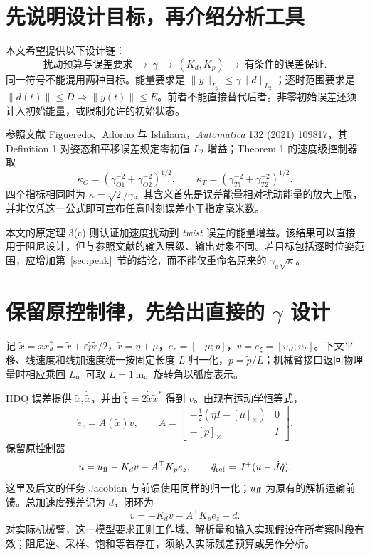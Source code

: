 \section{先说明设计目标，再介绍分析工具}

本文希望提供以下设计链：
\[
\boxed{\text{扰动预算与误差要求}\ \longrightarrow\ \gamma
\ \longrightarrow\ (K_d,K_p)\ \longrightarrow\ \text{有条件的误差保证}.}
\]
同一符号不能混用两种目标。能量要求是 $\|y\|_{L_2}\le\gamma\|d\|_{L_2}$；逐时范围要求是 $\|d(t)\|\le D\Rightarrow\|y(t)\|\le E$。前者不能直接替代后者。非零初始误差还须计入初始能量，或限制允许的初始状态。

参照文献 Figueredo、Adorno 与 Ishihara，\emph{Automatica} 132 (2021) 109817，其 Definition 1 对姿态和平移误差规定零初值 $L_2$ 增益；Theorem 1 的速度级控制器取
\[
\kappa_O=(\gamma_{O1}^{-2}+\gamma_{O2}^{-2})^{1/2},\qquad
\kappa_T=(\gamma_{T1}^{-2}+\gamma_{T2}^{-2})^{1/2}.
\]
四个指标相同时为 $\kappa=\sqrt2/\gamma$。其含义首先是误差能量相对扰动能量的放大上限，并非仅凭这一公式即可宣布任意时刻误差小于指定毫米数。

本文的原定理 3(c) 则认证加速度扰动到 \emph{twist} 误差的能量增益。该结果可以直接用于阻尼设计，但与参照文献的输入层级、输出对象不同。若目标包括逐时位姿范围，应增加第~\ref{sec:peak}~节的结论，而不能仅重命名原来的 $\gamma_a\sqrt\kappa$。

\section{保留原控制律，先给出直接的 \texorpdfstring{$\gamma$}{gamma} 设计}

记 $\widetilde x=xx_d^*=\widetilde r+\varepsilon\widetilde p\widetilde r/2$，$\widetilde r=\eta+\mu$，$e_z=[-\mu;p]$，$v=e_\xi=[v_R;v_T]$。下文平移、线速度和线加速度统一按固定长度 $L$ 归一化，$p=\widetilde p/L$；机械臂接口返回物理量时相应乘回 $L$。可取 $L=1\,\mathrm m$。旋转角以弧度表示。

HDQ 误差提供 $\widetilde x,\dot{\widetilde x}$，并由 $\widetilde\xi=2\dot{\widetilde x}\widetilde x^*$ 得到 $v$。由现有运动学恒等式，
\begin{equation}
\dot e_z=A(\widetilde x)v,
\qquad
A=\begin{bmatrix}
-\frac12(\eta I-[\mu]_\times)&0\\
-[p]_\times&I
\end{bmatrix}.
\label{new:kin}
\end{equation}
保留原控制器
\begin{equation}
u=u_{\rm ff}-K_dv-A^\top K_pe_z,
\qquad
\ddot q_{\rm ref}=J^+(u-\dot J\dot q).
\label{new:controller}
\end{equation}
这里及后文的任务 Jacobian 与前馈使用同样的归一化；$u_{\rm ff}$ 为原有的解析运输前馈。总加速度残差记为 $d$，闭环为
\begin{equation}
\dot v=-K_dv-A^\top K_pe_z+d.
\label{new:closed}
\end{equation}
对实际机械臂，这一模型要求正则工作域、解析量和输入实现假设在所考察时段有效；阻尼逆、采样、饱和等若存在，须纳入实际残差预算或另作分析。

